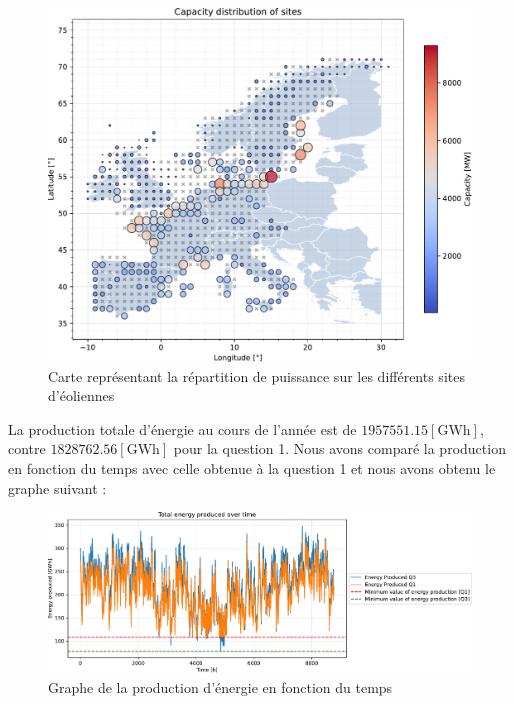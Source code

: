 \documentclass{article}
\newlength{\temp}
\begin{document}
\begin{figure}[h!]
    \centering
    \includegraphics[scale=0.4]{Images/Partie_1/Q3/capacity_distribution.pdf}
    \caption{Carte représentant la répartition de puissance sur les différents sites d'éoliennes}
    \label{fig:capacity_distribution_partie1_Q3}
\end{figure}

\newpage

La production totale d'énergie au cours de l'année est de $1957551.15 [\mathrm{GWh}]$, contre $1828762.56 [\mathrm{GWh}]$ pour la question 1. Nous avons comparé la production en fonction du temps avec celle obtenue à la question 1 et nous avons obtenu le graphe suivant :

\begin{figure}[h!]
    \centering
    \includegraphics[scale=0.5]{Images/Partie_1/Q3/energy_produced_comparison.pdf}
    \caption{Graphe de la production d'énergie en fonction du temps}
    \label{fig:energy_produced_partie1_Q3}
\end{figure}
\end{document}
